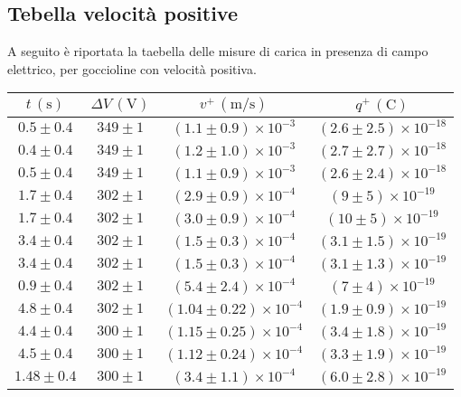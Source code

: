 \subsection{Tebella velocità positive}
A seguito è riportata la taebella delle misure di carica in presenza di campo elettrico, per goccioline con velocità positiva.        \renewcommand{\arraystretch}{1.3} %
        \begin{longtable}[C]{|c|c|c|c|}
            \hline
            $t \, (\mathrm{s})$ & $\Delta V \, (\mathrm{V})$ & $v^+ \, (\mathrm{m/s})$ & $q^+ \, (\mathrm{C})$ \\
            \hline
            $0.5 \pm 0.4$ & $349 \pm 1$ & $(1.1 \pm 0.9) \times 10^{-3}$ & $(2.6 \pm 2.5) \times 10^{-18}$ \\
            \hline
            $0.4 \pm 0.4$ & $349 \pm 1$ & $(1.2 \pm 1.0) \times 10^{-3}$ & $(2.7 \pm 2.7) \times 10^{-18}$ \\
            \hline
            $0.5 \pm 0.4$ & $349 \pm 1$ & $(1.1 \pm 0.9) \times 10^{-3}$ & $(2.6 \pm 2.4) \times 10^{-18}$ \\
            \hline
            $1.7 \pm 0.4$ & $302 \pm 1$ & $(2.9 \pm 0.9) \times 10^{-4}$ & $(9 \pm 5) \times 10^{-19}$ \\
            \hline
            $1.7 \pm 0.4$ & $302 \pm 1$ & $(3.0 \pm 0.9) \times 10^{-4}$ & $(10 \pm 5) \times 10^{-19}$ \\
            \hline
            $3.4 \pm 0.4$ & $302 \pm 1$ & $(1.5 \pm 0.3) \times 10^{-4}$ & $(3.1 \pm 1.5) \times 10^{-19}$ \\
            \hline
            $3.4 \pm 0.4$ & $302 \pm 1$ & $(1.5 \pm 0.3) \times 10^{-4}$ & $(3.1 \pm 1.3) \times 10^{-19}$ \\
            \hline
            $0.9 \pm 0.4$ & $302 \pm 1$ & $(5.4 \pm 2.4) \times 10^{-4}$ & $(7 \pm 4) \times 10^{-19}$ \\
            \hline
            $4.8 \pm 0.4$ & $302 \pm 1$ & $(1.04 \pm 0.22) \times 10^{-4}$ & $(1.9 \pm 0.9) \times 10^{-19}$ \\
            \hline
            $4.4 \pm 0.4$ & $300 \pm 1$ & $(1.15 \pm 0.25) \times 10^{-4}$ & $(3.4 \pm 1.8) \times 10^{-19}$ \\
            \hline
            $4.5 \pm 0.4$ & $300 \pm 1$ & $(1.12 \pm 0.24) \times 10^{-4}$ & $(3.3 \pm 1.9) \times 10^{-19}$ \\
            \hline
            $1.48 \pm 0.4$ & $300 \pm 1$ & $(3.4 \pm 1.1) \times 10^{-4}$ & $(6.0 \pm 2.8) \times 10^{-19}$ \\

\end{longtable}
